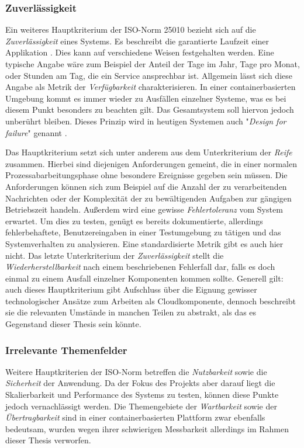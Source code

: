 \subsubsection{Zuverlässigkeit}
\label{ss:zuverlaessigkeit}


Ein weiteres Hauptkriterium der ISO-Norm 25010 bezieht sich auf die \emph{Zuverlässigkeit} eines Systems. Es beschreibt die garantierte Laufzeit einer Applikation \cite{nfr-dotnetcurry}. Dies kann auf verschiedene Weisen festgehalten werden. Eine typische Angabe wäre zum Beispiel der Anteil der Tage im Jahr, Tage pro Monat, oder Stunden am Tag, die ein Service ansprechbar ist. Allgemein lässt sich diese Angabe als Metrik der \emph{Verfügbarkeit} charakterisieren. In einer containerbasierten Umgebung kommt es immer wieder zu Ausfällen einzelner Systeme, was es bei diesem Punkt besonders zu beachten gilt. Das Gesamtsystem soll hiervon jedoch unberührt bleiben. Dieses Prinzip wird in heutigen Systemen auch "\emph{Design for failure}" genannt \cite[Seite~267]{continuous-delivery}. 

Das Hauptkriterium setzt sich unter anderem aus dem Unterkriterium der \emph{Reife} zusammen. Hierbei sind diejenigen Anforderungen gemeint, die in einer normalen Prozessabarbeitungsphase ohne besondere Ereignisse gegeben sein müssen. Die Anforderungen können sich zum Beispiel auf die Anzahl der zu verarbeitenden Nachrichten oder der Komplexität der zu bewältigenden Aufgaben zur gängigen Betriebszeit handeln. Außerdem wird eine gewisse \emph{Fehlertoleranz} vom System erwartet. Um dies zu testen, genügt es bereits dokumentierte, allerdings fehlerbehaftete, Benutzereingaben in einer Testumgebung zu tätigen und das Systemverhalten zu analysieren. Eine standardisierte Metrik gibt es auch hier nicht. Das letzte Unterkriterium der \emph{Zuverlässigkeit} stellt die \emph{Wiederherstellbarkeit} nach einem beschriebenen Fehlerfall dar, falls es doch einmal zu einem Ausfall einzelner Komponenten kommen sollte. Generell gilt: auch dieses Hauptkriterium gibt Aufschluss über die Eignung gewisser technologischer Ansätze zum Arbeiten als Cloudkomponente, dennoch beschreibt sie die relevanten Umstände in manchen Teilen zu abstrakt, als das es Gegenstand dieser Thesis sein könnte.

\subsubsection{Irrelevante Themenfelder}

Weitere Hauptkriterien der ISO-Norm betreffen die \emph{Nutzbarkeit} sowie die \emph{Sicherheit} der Anwendung. Da der Fokus des Projekts aber darauf liegt die Skalierbarkeit und Performance des Systems zu testen, können diese Punkte jedoch vernachlässigt werden. Die Themengebiete der \emph{Wartbarkeit} sowie der \emph{Übertragbarkeit} sind in einer containerbasierten Plattform zwar ebenfalls bedeutsam, wurden wegen ihrer schwierigen Messbarkeit allerdings im Rahmen dieser Thesis verworfen. 



